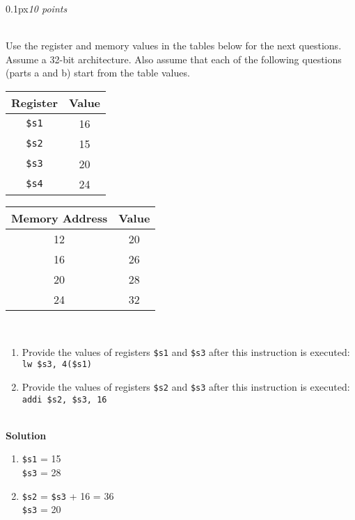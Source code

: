 \documentclass[11pt]{article}
\newcommand{\problem}[2]{\begin{adjustwidth}{0.1px}\noindent \framebox[1.2\width]{\large Problem #1}\hfill \emph{#2} \end{adjustwidth} \bigskip\\}
\newcommand{\code}[1]{{\texttt{#1}}}
\begin{document}
\newpage
\problem{8}{10 points}
Use the register and memory values in the tables below for the next questions. Assume a 32-bit architecture. Also assume that each of the following questions (parts a and b) start from the table values.
\\
\begin{center}

	\begin{tabular}{ |c|c| }
		\hline
		Register    & Value \\
		\hline
		\code{\$s1} & 16    \\
		\code{\$s2} & 15    \\
		\code{\$s3} & 20    \\
		\code{\$s4} & 24    \\
		\hline
	\end{tabular}
	\hspace{1cm}
	\begin{tabular}{ |c|c| }
		\hline
		Memory Address & Value \\
		\hline
		12             & 20    \\
		16             & 26    \\
		20             & 28    \\
		24             & 32    \\
		\hline
	\end{tabular}
\end{center}
\medskip\\
\begin{enumerate}[label=(\alph*)]
	\item Provide the values of registers \code{\$s1} and \code{\$s3} after this instruction is executed:\\
	      \code{lw \$s3, 4(\$s1)}

	\item Provide the values of registers \code{\$s2} and \code{\$s3} after this instruction is executed:\\
	      \code{addi \$s2, \$s3, 16}
\end{enumerate}
\bigskip \\
\textbf{Solution}
\begin{enumerate}[label=(\alph*)]
	\item \code{\$s1} = 15\\ \code{\$s3} = 28
	\item \code{\$s2} = \code{\$s3} + 16 = 36\\ \code{\$s3} = 20
\end{enumerate}
\end{document}
